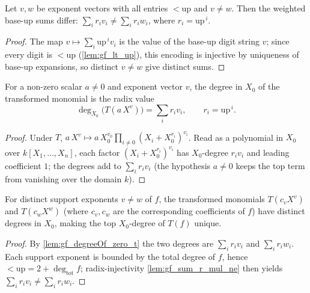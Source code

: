 \begin{lemma}
  \label{lem:gf_sum_r_mul_ne}
  Let \(v, w\) be exponent vectors with all entries \(< \mathrm{up}\) and \(v \ne w\). Then
  the weighted base-\(\mathrm{up}\) sums differ:
  \(\sum_i r_i v_i \ne \sum_i r_i w_i\), where \(r_i = \mathrm{up}^{\,i}\).
\end{lemma}
\begin{proof}
  \leanok
  The map \(v \mapsto \sum_i \mathrm{up}^{\,i} v_i\) is the value of the base-\(\mathrm{up}\)
  digit string \(v\); since every digit is \(< \mathrm{up}\) (\cref{lem:gf_lt_up}), this
  encoding is injective by uniqueness of base-\(\mathrm{up}\) expansions, so distinct
  \(v \ne w\) give distinct sums.
\end{proof}

\begin{lemma}
  \label{lem:gf_degreeOf_zero_t}
  For a non-zero scalar \(a \ne 0\) and exponent vector \(v\), the degree in \(X_0\) of the
  transformed monomial is the radix value
  \[
    \deg_{X_0}\!\big(T(a\,X^v)\big) = \sum_i r_i v_i, \qquad r_i = \mathrm{up}^{\,i}.
  \]
\end{lemma}
\begin{proof}
  \leanok
  Under \(T\), \(a\,X^v \mapsto a\,X_0^{v_0}\prod_{i \ne 0}(X_i + X_0^{r_i})^{v_i}\). Read as
  a polynomial in \(X_0\) over \(k[X_1, \dots, X_n]\), each factor
  \((X_i + X_0^{r_i})^{v_i}\) has \(X_0\)-degree \(r_i v_i\) and leading coefficient \(1\);
  the degrees add to \(\sum_i r_i v_i\) (the hypothesis \(a \ne 0\) keeps the top term from
  vanishing over the domain \(k\)).
\end{proof}

\begin{lemma}
  \label{lem:gf_degreeOf_t_ne_of_ne}
  For distinct support exponents \(v \ne w\) of \(f\), the transformed monomials
  \(T(c_v X^v)\) and \(T(c_w X^w)\) (where \(c_v, c_w\) are the corresponding coefficients
  of \(f\)) have distinct degrees in \(X_0\), making the top \(X_0\)-degree of \(T(f)\) unique.
\end{lemma}
\begin{proof}
  \leanok
  By \cref{lem:gf_degreeOf_zero_t} the two degrees are \(\sum_i r_i v_i\) and
  \(\sum_i r_i w_i\). Each support exponent is bounded by the total degree of \(f\), hence
  \(< \mathrm{up} = 2 + \deg_{\mathrm{tot}} f\); radix-injectivity
  \cref{lem:gf_sum_r_mul_ne} then yields \(\sum_i r_i v_i \ne \sum_i r_i w_i\).
\end{proof}

